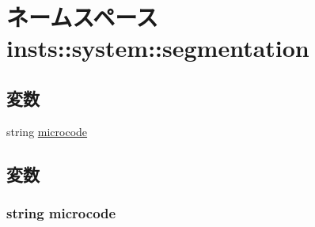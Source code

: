\hypertarget{namespaceinsts_1_1system_1_1segmentation}{
\section{ネームスペース insts::system::segmentation}
\label{namespaceinsts_1_1system_1_1segmentation}
}
\subsection*{変数}
\begin{DoxyCompactItemize}
\item 
string \hyperlink{namespaceinsts_1_1system_1_1segmentation_a770f11a173e99389a8802f0107ed8f52}{microcode}
\end{DoxyCompactItemize}


\subsection{変数}
\hypertarget{namespaceinsts_1_1system_1_1segmentation_a770f11a173e99389a8802f0107ed8f52}{
\subsubsection[{microcode}]{\setlength{\rightskip}{0pt plus 5cm}string {\bf microcode}}}
\label{namespaceinsts_1_1system_1_1segmentation_a770f11a173e99389a8802f0107ed8f52}
